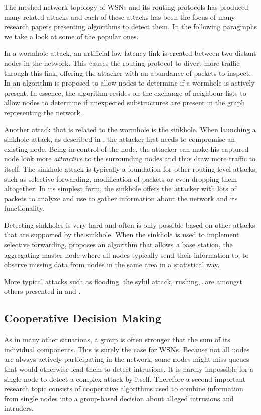 \documentclass[conference]{IEEEtran}
\begin{document}
The meshed network topology of WSNs and its routing protocols has produced many
related attacks and each of these attacks has been the focus of many research
papers presenting algorithms to detect them. In the following paragraphs we
take a look at some of the popular ones.

In a wormhole attack, an artificial low-latency link is created between two
distant nodes in the network. This causes the routing protocol to divert more
traffic through this link, offering the attacker with an abundance of packets
to inspect. In \cite{maheshwari2007detecting} an algorithm is proposed to allow
nodes to determine if a wormhole is actively present. In essence, the algorithm
resides on the exchange of neighbour lists to allow nodes to determine if
unexpected substructures are present in the graph representing the network.

Another attack that is related to the wormhole is the sinkhole. When launching
a sinkhole attack, as described in \cite{krontiris2008launching}, the attacker
first needs to compromise an existing node. Being in control of the node, the
attacker can make his captured node look more \emph{attractive} to the
surrounding nodes and thus draw more traffic to itself. The sinkhole attack is
typically a foundation for other routing level attacks, such as selective
forwarding, modification of packets or even dropping them altogether. In its
simplest form, the sinkhole offers the attacker with lots of packets to analyze
and use to gather information about the network and its functionality.

Detecting sinkholes is very hard and often is only possible based on other
attacks that are supported by the sinkhole. When the sinkhole is used to
implement selective forwarding, \cite{ngai2006intruder} proposes an algorithm
that allows a base station, the aggregating master node where all nodes
typically send their information to, to observe missing data from nodes in the
same area in a statistical way.

More typical attacks such as flooding, the sybil attack, rushing,\dots are
amongst others presented in \cite{wood2002denial} and \cite{djenouri2005survey}.

\subsection{Cooperative Decision Making}
\label{subsection:coorperative}

As in many other situations, a group is often stronger that the sum of its
individual components. This is surely the case for WSNs. Because not all nodes
are always actively participating in the network, some nodes might miss queues
that would otherwise lead them to detect intrusions. It is hardly impossible
for a single node to detect a complex attack by itself. Therefore a second
important research topic consists of cooperative algorithms used to combine
information from single nodes into a group-based decision about alleged
intrusions and intruders.
\end{document}
